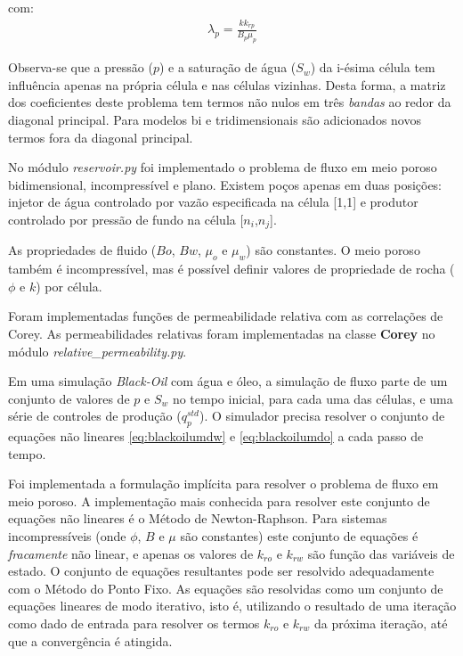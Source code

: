 \documentclass[final,5p]{elsarticle}
\numberwithin{equation}{section}
\begin{document}
        \noindent com:
        \begin{align}
            \lambda_p = \frac{k k_{rp}}{B_p \mu_p} \nonumber
        \end{align}

        Observa-se que a pressão ($p$) e a saturação de água ($S_w$) da i-ésima célula tem influência apenas na própria célula e nas células vizinhas. Desta forma, a matriz dos coeficientes deste problema tem termos não nulos em três \emph{bandas} ao redor da diagonal principal. Para modelos bi e tridimensionais são adicionados novos termos fora da diagonal principal.

        No módulo \emph{reservoir.py} foi implementado o problema de fluxo em meio poroso bidimensional, incompressível e plano. Existem poços apenas em duas posições: injetor de água controlado por vazão especificada na célula [1,1] e produtor controlado por pressão de fundo na célula [$n_i$,$n_j$].

        As propriedades de fluido ($Bo$, $Bw$, $\mu_o$ e $\mu_w$) são constantes. O meio poroso também é incompressível, mas é possível definir valores de propriedade de rocha ($\phi$ e $k$) por célula.

        Foram implementadas funções de permeabilidade relativa com as correlações de Corey\cite{1570009749409873792}. As permeabilidades relativas foram implementadas na classe \textbf{Corey} no módulo \emph{relative\_permeability.py}.

        Em uma simulação \emph{Black-Oil} com água e óleo, a simulação de fluxo parte de um conjunto de valores de $p$ e $S_w$ no tempo inicial, para cada uma das células, e uma série de controles de produção ($q^{std}_p$). O simulador precisa resolver o conjunto de equações não lineares \ref{eq:blackoilumdw} e \ref{eq:blackoilumdo} a cada passo de tempo.

        Foi implementada a formulação implícita para resolver o problema de fluxo em meio poroso. A implementação mais conhecida para resolver este conjunto de equações não lineares é o Método de Newton-Raphson. Para sistemas incompressíveis (onde $\phi$, $B$ e $\mu$ são constantes) este conjunto de equações é \emph{fracamente} não linear, e apenas os valores de $k_{ro}$ e $k_{rw}$ são função das variáveis de estado. O conjunto de equações resultantes pode ser resolvido adequadamente com o Método do Ponto Fixo\cite{burden2016analise}. As equações são resolvidas como um conjunto de equações lineares de modo iterativo, isto é, utilizando o resultado de uma iteração como dado de entrada para resolver os termos $k_{ro}$ e $k_{rw}$ da próxima iteração, até que a convergência é atingida.
\end{document}
